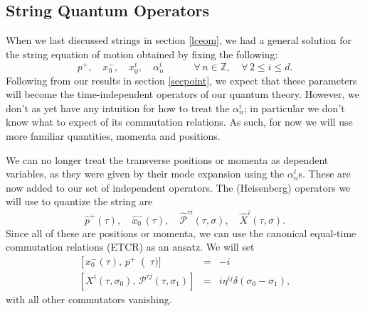 \documentclass[a4paper,12pt]{article}
\numberwithin{equation}{section}
\begin{document}
\subsection{String Quantum Operators}
When we last discussed strings in section \ref{lceom}, we had a general solution for the string equation of motion obtained by fixing the following:
\begin{equation}
p^+,\quad x_0^-,\quad x_0^i,\quad \alpha_n^i\quad\quad\quad \forall\, n \in \mathbb{Z},\quad \forall\, 2 \leq i \leq d.
\end{equation}
Following from our results in section \ref{secpoint}, we expect that these parameters will become the time-independent operators of our quantum theory. However, we don't as yet have any intuition for how to treat the $\alpha_n^i$; in particular we don't know what to expect of its commutation relations. As such, for now we will use more familiar quantities, momenta and positions.

We can no longer treat the transverse positions or momenta as dependent variables, as they were given by their mode expansion using the $\alpha_n^i$s. These are now added to our set of independent operators. The (Heisenberg) operators we will use to quantize the string are
\begin{equation}
\hat{p}^+(\tau),\quad \hat{x}_0^-(\tau),\quad \hat{\mathcal{P}}^{\tau i}(\tau,\sigma),\quad \hat{X}^i(\tau,\sigma).
\end{equation}
Since all of these are positions or momenta, we can use the canonical equal-time commutation relations (ETCR) as an ansatz. We will set
\begin{eqnarray}
\left[x_0^-(\tau),\,p^+\right(\tau)] &=& -i \\
\left[X^i(\tau,\sigma_0),\,\mathcal{P}^{\tau j}(\tau,\sigma_1)\right] &=& i\eta^{i j}\delta(\sigma_0 - \sigma_1),
\end{eqnarray}
with all other commutators vanishing.
\end{document}
